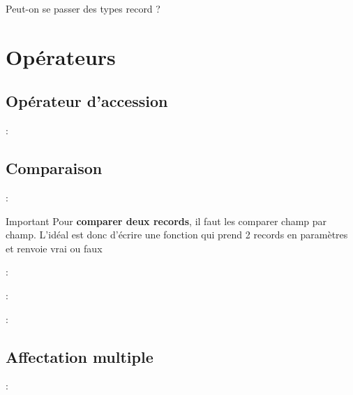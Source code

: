 \documentclass[10pt]{beamer}
\begin{document}
\begin{frame}[standout]
    Peut-on se passer des types record ?
\end{frame}
\section{Opérateurs}
\tocss
\subsection{Opérateur d’accession}
\begin{frame}{\secname : \subsecname}
    
\end{frame}
\subsection{Comparaison}
\begin{frame}{\secname : \subsecname}
    \begin{alertblock}{Important}
        Pour \textbf{comparer deux records}, il faut les comparer champ par champ.
        L'idéal est donc d'écrire une fonction qui prend 2 records en paramètres et renvoie vrai ou faux
    \end{alertblock}
\end{frame}

\begin{frame}{\secname : \subsecname}
    
\end{frame}

\begin{frame}{\secname : \subsecname}
    
\end{frame}

\begin{frame}{\secname : \subsecname}
    
\end{frame}

\subsection{Affectation multiple}

\begin{frame}{\secname : \subsecname}
    
\end{frame}
\end{document}
